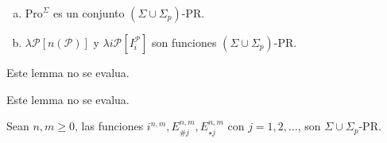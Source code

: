   \begin{lemma}
    \begin{enumerate}[a)]
      \item $\mathrm{Pro}^{\Sigma}$ es un conjunto $(\Sigma \cup \Sigma_{p})$-PR.
      \item $\lambda \mathcal{P} \left[n(\mathcal{P})\right]$ y $\lambda i\mathcal{P} \left[I_{i}^{\mathcal{P}}\right]$
        son funciones $(\Sigma \cup \Sigma_{p})$-PR.
    \end{enumerate}
  \end{lemma}

  \begin{lemma}
    \PN Este lemma no se evalua.
  \end{lemma}

  \begin{lemma}
    \PN Este lemma no se evalua.
  \end{lemma}

  \begin{proposition}
    \PN Sean $n, m \geq 0$, las funciones $i^{n,m}, E_{\#j}^{n,m}, E_{\star j}^{n,m}$ con $j = 1,2,\dotsc$, son $\Sigma
    \cup \Sigma_{p}$-PR.
  \end{proposition}

